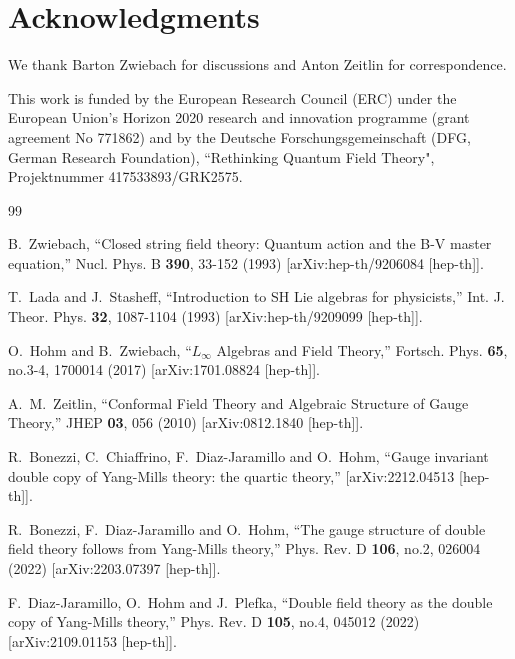 \documentclass[12pt]{article}\pdfoutput=1
\begin{document}
\medskip

 \section*{Acknowledgments} 

We thank Barton Zwiebach for discussions and Anton Zeitlin for correspondence. 

\noindent
This work is funded   by the European Research Council (ERC) under the European Union's Horizon 2020 research and innovation programme (grant agreement No 771862)
and by the Deutsche Forschungsgemeinschaft (DFG, German Research Foundation), ``Rethinking Quantum Field Theory", Projektnummer 417533893/GRK2575.   





\begin{thebibliography}{99}

B.~Zwiebach,
``Closed string field theory: Quantum action and the B-V master equation,''
Nucl. Phys. B \textbf{390}, 33-152 (1993)
[arXiv:hep-th/9206084 [hep-th]].

T.~Lada and J.~Stasheff,
``Introduction to SH Lie algebras for physicists,''
Int. J. Theor. Phys. \textbf{32}, 1087-1104 (1993)
[arXiv:hep-th/9209099 [hep-th]].

O.~Hohm and B.~Zwiebach,
``$L_{\infty}$ Algebras and Field Theory,''
Fortsch. Phys. \textbf{65}, no.3-4, 1700014 (2017)
[arXiv:1701.08824 [hep-th]].

A.~M.~Zeitlin,
``Conformal Field Theory and Algebraic Structure of Gauge Theory,''
JHEP \textbf{03}, 056 (2010)
[arXiv:0812.1840 [hep-th]].



R.~Bonezzi, C.~Chiaffrino, F.~Diaz-Jaramillo and O.~Hohm,
``Gauge invariant double copy of Yang-Mills theory: the quartic theory,''
[arXiv:2212.04513 [hep-th]].

R.~Bonezzi, F.~Diaz-Jaramillo and O.~Hohm,
``The gauge structure of double field theory follows from Yang-Mills theory,''
Phys. Rev. D \textbf{106}, no.2, 026004 (2022)
[arXiv:2203.07397 [hep-th]].

F.~Diaz-Jaramillo, O.~Hohm and J.~Plefka,
``Double field theory as the double copy of Yang-Mills theory,''
Phys. Rev. D \textbf{105}, no.4, 045012 (2022)
[arXiv:2109.01153 [hep-th]].


\end{thebibliography}
\end{document}
